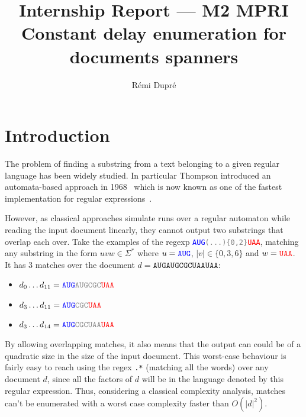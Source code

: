 \documentclass[11px]{article}
\title{%
  Internship Report --- M2 MPRI \\
  Constant delay enumeration for documents spanners
}
\author{Rémi Dupré}
\theoremstyle{definition}
\begin{document}
  \maketitle
  \vspace{2cm}
  

  \pagebreak

  \tableofcontents

  \pagebreak

  \section{Introduction}

    The problem of finding a substring from a text belonging to a given regular
    language has been widely studied. In particular Thompson introduced an
    automata-based approach in 1968~\cite{thompson1968programming} which is now
    known as one of the fastest implementation for regular
    expressions~\cite{cox2007regular}.

    However, as classical approaches simulate runs over a regular automaton
    while reading the input document linearly, they cannot output two
    substrings that overlap each over. Take the examples of the regexp
    \texttt{\textcolor{blue}{AUG}\textcolor{gray}{(...)\{0,2\}}\textcolor{red}{UAA}},
    matching any substring in the form $uvw \in \Sigma^*$ where $u =
    \texttt{\textcolor{blue}{AUG}}$, $|v| \in \{0, 3, 6\}$ and $w =
    \texttt{\textcolor{red}{UAA}}$. It has 3 matches over the document $d =
    \texttt{AUGAUGCGCUAAUAA}$:
      \begin{itemize}
        \item $d_0 \ldots d_{11} =
          \texttt{\textcolor{blue}{AUG}\textcolor{gray}{AUGCGC}\textcolor{red}{UAA}}$
        \item $d_3 \ldots d_{11} =
          \texttt{\textcolor{blue}{AUG}\textcolor{gray}{CGC}\textcolor{red}{UAA}}$
        \item $d_3 \ldots d_{14} =
          \texttt{\textcolor{blue}{AUG}\textcolor{gray}{CGCUAA}\textcolor{red}{UAA}}$
      \end{itemize}

    By allowing overlapping matches, it also means that the output can could be
    of a quadratic size in the size of the input document. This worst-case
    behaviour is fairly easy to reach using the regex \texttt{.*} (matching all
    the words) over any document $d$, since all the factors of $d$ will be in
    the language denoted by this regular expression. Thus, considering a
    classical complexity analysis, matches can't be enumerated with a worst
    case complexity faster than $O(|d|^2)$.
\end{document}

